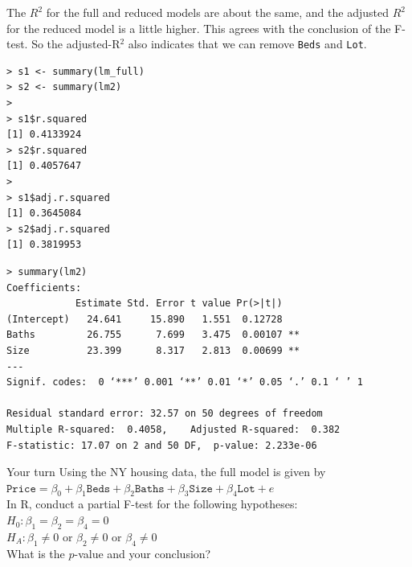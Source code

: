 \documentclass[10pt]{beamer}\usepackage[]{graphicx}\usepackage[]{color}
\begin{document}
\begin{frame}[fragile]
The $R^2$ for the full and reduced models are about the same, and the adjusted $R^2$ for the reduced model is a little higher.  This agrees with the conclusion of the F-test.  So the adjusted-R$^2$ also indicates that we can remove  \texttt{Beds} and \texttt{Lot}.
\small
\begin{verbatim}
> s1 <- summary(lm_full)
> s2 <- summary(lm2)
> 
> s1$r.squared
[1] 0.4133924
> s2$r.squared
[1] 0.4057647
> 
> s1$adj.r.squared
[1] 0.3645084
> s2$adj.r.squared
[1] 0.3819953
\end{verbatim}
\end{frame}

\begin{frame}[fragile]
\small
\begin{verbatim}
> summary(lm2)
Coefficients:
            Estimate Std. Error t value Pr(>|t|)   
(Intercept)   24.641     15.890   1.551  0.12728   
Baths         26.755      7.699   3.475  0.00107 **
Size          23.399      8.317   2.813  0.00699 **
---
Signif. codes:  0 ‘***’ 0.001 ‘**’ 0.01 ‘*’ 0.05 ‘.’ 0.1 ‘ ’ 1

Residual standard error: 32.57 on 50 degrees of freedom
Multiple R-squared:  0.4058,	Adjusted R-squared:  0.382 
F-statistic: 17.07 on 2 and 50 DF,  p-value: 2.233e-06
\end{verbatim}
\end{frame}

\begin{frame}{Your turn}
\vspace{-2.5cm}
Using the NY housing data, the full model is given by\\
$\texttt{Price} = \beta_0 + \beta_1 \texttt{Beds} + \beta_2 \texttt{Baths} + \beta_3 \texttt{Size} + \beta_4 \texttt{Lot} + e$\\
\vspace{10pt}
In R, conduct a partial F-test for the following hypotheses:\\
$H_0: \beta_1 = \beta_2 = \beta_4 = 0$\\
$H_A: \beta_1 \neq 0$ or $\beta_2 \neq 0$ or $\beta_4 \neq 0$\\
\vspace{10pt}
What is the $p$-value and your conclusion? 
\end{frame}
\end{document}
